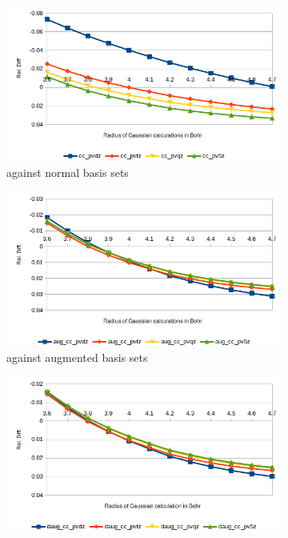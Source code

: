 \documentclass[../Thesis.tex]{subfiles}
\begin{document}
\begin{figure}[h!]
  \centering
  \begin{subfigure}[b]{0.75\linewidth}
    \includegraphics[width=\linewidth]{img/watreldiff02.png}
        \caption{\mrchem against normal basis sets}
  \end{subfigure}
  \begin{subfigure}[b]{0.75\linewidth}
    \includegraphics[width=\linewidth]{img/wataugreldiff02.png}
        \caption{\mrchem against augmented basis sets}
  \end{subfigure}
  \begin{subfigure}[b]{0.75\linewidth}
    \includegraphics[width=\linewidth]{img/watdaugreldiff02.png}

\end{subfigure}
\end{figure}
\end{document}
